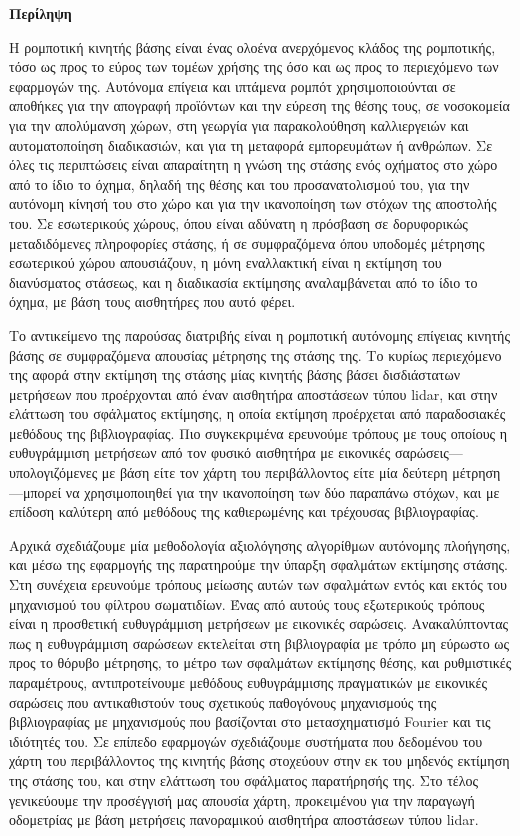 \singlespace

\vfill
\begin{center}
\textbf{Περίληψη}
\end{center}
\noindent

Η ρομποτική κινητής βάσης είναι ένας ολοένα ανερχόμενος κλάδος της ρομποτικής,
τόσο ως προς το εύρος των τομέων χρήσης της όσο και ως προς το περιεχόμενο των
εφαρμογών της. Αυτόνομα επίγεια και ιπτάμενα ρομπότ χρησιμοποιούνται σε
αποθήκες για την απογραφή προϊόντων και την εύρεση της θέσης τους, σε
νοσοκομεία για την απολύμανση χώρων, στη γεωργία για παρακολούθηση καλλιεργειών
και αυτοματοποίηση διαδικασιών, και για τη μεταφορά εμπορευμάτων ή ανθρώπων. Σε
όλες τις περιπτώσεις είναι απαραίτητη η γνώση της στάσης ενός οχήματος στο χώρο
από το ίδιο το όχημα, δηλαδή της θέσης και του προσανατολισμού του, για την
αυτόνομη κίνησή του στο χώρο και για την ικανοποίηση των στόχων της αποστολής
του. Σε εσωτερικούς χώρους, όπου είναι αδύνατη η πρόσβαση σε δορυφορικώς
μεταδιδόμενες πληροφορίες στάσης, ή σε συμφραζόμενα όπου υποδομές μέτρησης
εσωτερικού χώρου απουσιάζουν, η μόνη εναλλακτική είναι η εκτίμηση του
διανύσματος στάσεως, και η διαδικασία εκτίμησης αναλαμβάνεται από το ίδιο το
όχημα, με βάση τους αισθητήρες που αυτό φέρει.

Το αντικείμενο της παρούσας διατριβής είναι η ρομποτική αυτόνομης επίγειας
κινητής βάσης σε συμφραζόμενα απουσίας μέτρησης της στάσης της. Το κυρίως
περιεχόμενο της αφορά στην εκτίμηση της στάσης μίας κινητής βάσης βάσει
δισδιάστατων μετρήσεων που προέρχονται από έναν αισθητήρα αποστάσεων τύπου
lidar, και στην ελάττωση του σφάλματος εκτίμησης, η οποία εκτίμηση προέρχεται
από παραδοσιακές μεθόδους της βιβλιογραφίας. Πιο συγκεκριμένα ερευνούμε τρόπους
με τους οποίους η ευθυγράμμιση μετρήσεων από τον φυσικό αισθητήρα με εικονικές
σαρώσεις---υπολογιζόμενες με βάση είτε τον χάρτη του περιβάλλοντος είτε μία
δεύτερη μέτρηση---μπορεί να χρησιμοποιηθεί για την ικανοποίηση των δύο παραπάνω
στόχων, και με επίδοση καλύτερη από μεθόδους της καθιερωμένης και τρέχουσας
βιβλιογραφίας.

Αρχικά σχεδιάζουμε μία μεθοδολογία αξιολόγησης αλγορίθμων αυτόνομης πλοήγησης,
και μέσω της εφαρμογής της παρατηρούμε την ύπαρξη σφαλμάτων εκτίμησης στάσης.
Στη συνέχεια ερευνούμε τρόπους μείωσης αυτών των σφαλμάτων εντός και εκτός του
μηχανισμού του φίλτρου σωματιδίων. Ένας από αυτούς τους εξωτερικούς τρόπους
είναι η προσθετική ευθυγράμμιση μετρήσεων με εικονικές σαρώσεις.
Ανακαλύπτοντας πως η ευθυγράμμιση σαρώσεων εκτελείται στη βιβλιογραφία με τρόπο
μη εύρωστο ως προς το θόρυβο μέτρησης, το μέτρο των σφαλμάτων εκτίμησης θέσης,
και ρυθμιστικές παραμέτρους, αντιπροτείνουμε μεθόδους ευθυγράμμισης πραγματικών
με εικονικές σαρώσεις που αντικαθιστούν τους σχετικούς παθογόνους μηχανισμούς
της βιβλιογραφίας με μηχανισμούς που βασίζονται στο μετασχηματισμό Fourier και
τις ιδιότητές του. Σε επίπεδο εφαρμογών σχεδιάζουμε συστήματα που δεδομένου
του χάρτη του περιβάλλοντος της κινητής βάσης στοχεύουν στην εκ του μηδενός
εκτίμηση της στάσης του, και στην ελάττωση του σφάλματος παρατήρησής της. Στο
τέλος γενικεύουμε την προσέγγισή μας απουσία χάρτη, προκειμένου για την
παραγωγή οδομετρίας με βάση μετρήσεις πανοραμικού αισθητήρα αποστάσεων τύπου
lidar.


